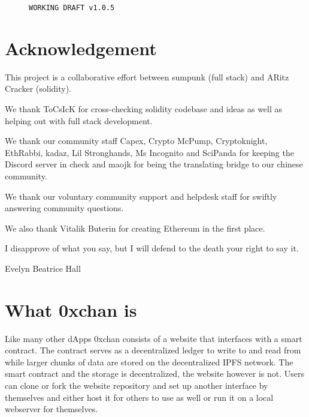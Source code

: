 \documentclass[a4paper]{article}
\title{\projectname}
\author{
  sumpunk\\
  \texttt{sumpunk@protonmail.com}
  \and
  ARitz Cracker\\
  \texttt{aritz@aritzcracker.ca}
}
\newcommand{\projectname}{0xchan}
\begin{document}
\maketitle

\begin{figure}[H]
    \centering
    \texttt{WORKING DRAFT v1.0.5}

\end{figure}

\begin{abstract}
\projectname{} is a decentralized and immutable message board system on the Ethereum blockchain where users can post messages and media files. Storage of those messages is handled via IPFS and a smart contract is used to store a ledger of all messages. A Proof of Stake style mechanism ensures quality content and protects the system against spam, while also incentivising users to stake their Ether. The immutable and decentralized nature of the system allows for free speech and gives way to create truly censorship resistant and self sustaining platforms.

\end{abstract}

\section*{Acknowledgement}
This project is a collaborative effort between sumpunk (full stack) and ARitz Cracker (solidity). 

We thank ToCsIcK for cross-checking solidity codebase and ideas as well as helping out with full stack development.

We thank our community staff Capex, Crypto McPump, Cryptoknight, EthRabbi, kadaz, Lil Stronghands, Ms Incognito and SciPanda for keeping the Discord server in check and maojk for being the translating bridge to our chinese community.

We thank our voluntary community support and helpdesk staff for swiftly answering community questions.

We also thank Vitalik Buterin for creating Ethereum in the first place.

\vspace*{\fill}
\epigraph{I disapprove of what you say, but I will defend to the death your right to say it.}{Evelyn Beatrice Hall}

\pagebreak

\section{What \projectname{} is}
Like many other dApps \projectname{} consists of a website that interfaces with a smart contract. The contract serves as a decentralized ledger to write to and read from while larger chunks of data are stored on the decentralized IPFS network. The smart contract and the storage is decentralized, the website however is not. Users can clone or fork the website repository and set up another interface by themselves and either host it for others to use as well or run it on a local webserver for themselves.
\end{document}
